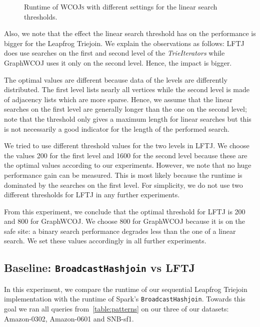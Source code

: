 \begin{figure}
    \centering
    \caption{Runtime of \textsc{WCOJs} with different settings for the linear search thresholds.}
    \label{fig:linear-search-threshold}
\end{figure}

Also, we note that the effect the linear search threshold has on the performance is bigger for the Leapfrog Triejoin.
We explain the observations as follows: \textsc{LFTJ} does use searches on the first
and second level of the \textit{TrieIterators} while GraphWCOJ uses it only on the second
level.
Hence, the impact is bigger.

The optimal values are different because data of the levels are differently distributed.
The first level lists nearly all vertices while the second level is made of adjacency lists which are more
sparse.
Hence, we assume that the linear searches on the first level are generally longer than
the one on the second level;
note that the threshold only gives a maximum length for linear searches but this is not
necessarily a good indicator for the length of the performed search.

We tried to use different threshold values for the two levels in \textsc{LFTJ}.
We choose the values 200 for the first level and 1600 for the second level because these
are the optimal values according to our experiments.
However, we note that no huge performance gain can be measured.
This is most likely because the runtime is dominated by the searches on the first level.
For simplicity, we do not use two different thresholds for \textsc{LFTJ} in any further experiments.

From this experiment, we conclude that the optimal threshold for \textsc{LFTJ} is 200 and 800
for GraphWCOJ.
We choose 800 for GraphWCOJ because it is on the safe site:
a binary search performance degrades less than the one of a linear search.
We set these values accordingly in all further experiments.

\subsection{Baseline: \texttt{BroadcastHashjoin} vs \textsc{LFTJ}} \label{subsec:spark-vs-lftj}
In this experiment, we compare the runtime of our sequential Leapfrog Triejoin implementation with the runtime of Spark's \texttt{BroadcastHashjoin}.
Towards this goal we ran all queries from~\cref{table:patterns} on our three of our datasets: Amazon-0302, Amazon-0601
and SNB-sf1.

